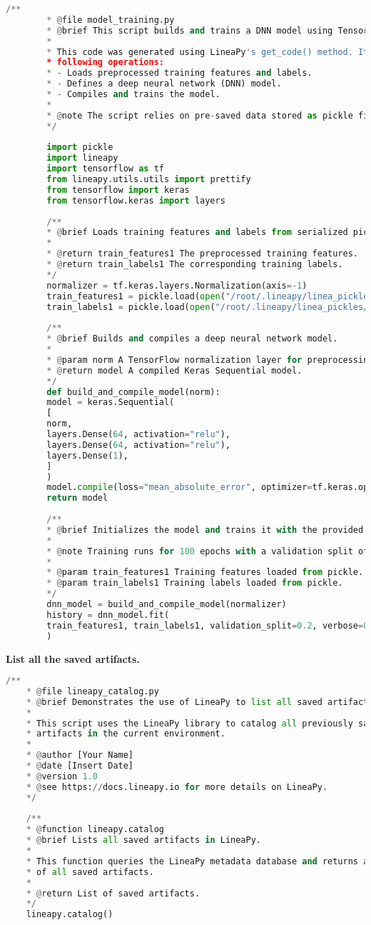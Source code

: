 	\begin{lstlisting}[language=Python]
		/**
		* @file model_training.py
		* @brief This script builds and trains a DNN model using TensorFlow.
		* 
		* This code was generated using LineaPy's get_code() method. It performs the 
		* following operations:
		* - Loads preprocessed training features and labels.
		* - Defines a deep neural network (DNN) model.
		* - Compiles and trains the model.
		* 
		* @note The script relies on pre-saved data stored as pickle files.
		*/
		
		import pickle
		import lineapy
		import tensorflow as tf
		from lineapy.utils.utils import prettify
		from tensorflow import keras
		from tensorflow.keras import layers
		
		/**
		* @brief Loads training features and labels from serialized pickle files.
		* 
		* @return train_features1 The preprocessed training features.
		* @return train_labels1 The corresponding training labels.
		*/
		normalizer = tf.keras.layers.Normalization(axis=-1)
		train_features1 = pickle.load(open("/root/.lineapy/linea_pickles/yzU2NLl", "rb"))
		train_labels1 = pickle.load(open("/root/.lineapy/linea_pickles/GPSupKi", "rb"))
		
		/**
		* @brief Builds and compiles a deep neural network model.
		* 
		* @param norm A TensorFlow normalization layer for preprocessing input data.
		* @return model A compiled Keras Sequential model.
		*/
		def build_and_compile_model(norm):
		model = keras.Sequential(
		[
		norm,
		layers.Dense(64, activation="relu"),
		layers.Dense(64, activation="relu"),
		layers.Dense(1),
		]
		)
		model.compile(loss="mean_absolute_error", optimizer=tf.keras.optimizers.Adam(0.001))
		return model
		
		/**
		* @brief Initializes the model and trains it with the provided data.
		* 
		* @note Training runs for 100 epochs with a validation split of 20%.
		* 
		* @param train_features1 Training features loaded from pickle.
		* @param train_labels1 Training labels loaded from pickle.
		*/
		dnn_model = build_and_compile_model(normalizer)
		history = dnn_model.fit(
		train_features1, train_labels1, validation_split=0.2, verbose=0, epochs=100
		)
	\end{lstlisting}
	

	\textbf{List all the saved artifacts.}
	
\begin{lstlisting}[language=Python]
	/**
	* @file lineapy_catalog.py
	* @brief Demonstrates the use of LineaPy to list all saved artifacts.
	* 
	* This script uses the LineaPy library to catalog all previously saved
	* artifacts in the current environment.
	* 
	* @author [Your Name]
	* @date [Insert Date]
	* @version 1.0
	* @see https://docs.lineapy.io for more details on LineaPy.
	*/
	
	/**
	* @function lineapy.catalog
	* @brief Lists all saved artifacts in LineaPy.
	* 
	* This function queries the LineaPy metadata database and returns a list
	* of all saved artifacts.
	* 
	* @return List of saved artifacts.
	*/
	lineapy.catalog()
\end{lstlisting}
	

